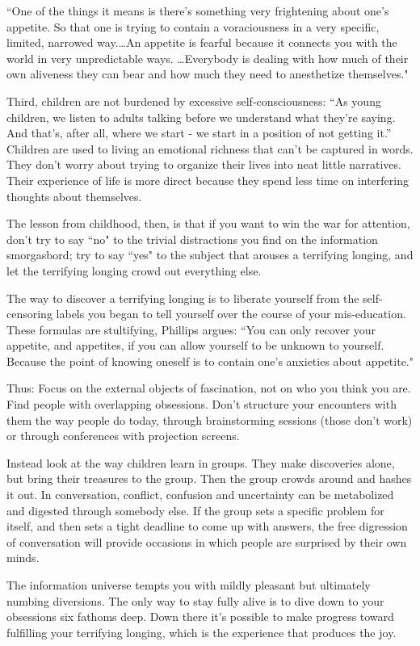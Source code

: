 \begin{linenumbers*}
\indent ``One of the things it means is there's something very frightening about one's appetite. So that one is trying to contain a voraciousness in a very specific, limited, narrowed way.\ldots An appetite is fearful because it connects you with the world in very unpredictable ways. \dots Everybody is dealing with how much of their own aliveness they can bear and how much they need to anesthetize themselves."

\indent Third, children are not burdened by excessive self-consciousness: ``As young children, we listen to adults talking before we understand what they're saying. And that's, after all, where we start - we start in a position of not getting it.” Children are used to living an emotional richness that can't be captured in words. They don't worry about trying to organize their lives into neat little narratives. Their experience of life is more direct because they spend less time on interfering thoughts about themselves.

\indent The lesson from childhood, then, is that if you want to win the war for attention, don't try to say ``no" to the trivial distractions you find on the information smorgasbord; try to say ``yes" to the subject that arouses a terrifying longing, and let the terrifying longing crowd out everything else.

The way to discover a terrifying longing is to liberate yourself from the self-censoring labels you began to tell yourself over the course of your mis-education. These formulas are stultifying, Phillips argues: ``You can only recover your appetite, and appetites, if you can allow yourself to be unknown to yourself. Because the point of knowing oneself is to contain one's anxieties about appetite."

\indent Thus: Focus on the external objects of fascination, not on who you think you are. Find people with overlapping obsessions. Don't structure your encounters with them the way people do today, through brainstorming sessions (those don't work) or through conferences with projection screens.

\indent Instead look at the way children learn in groups. They make discoveries alone, but bring their treasures to the group. Then the group crowds around and hashes it out. In conversation, conflict, confusion and uncertainty can be metabolized and digested through somebody else. If the group sets a specific problem for itself, and then sets a tight deadline to come up with answers, the free digression of conversation will provide occasions in which people are surprised by their own minds.

\indent The information universe tempts you with mildly pleasant but ultimately numbing diversions. The only way to stay fully alive is to dive down to your obsessions six fathoms deep. Down there it's possible to make progress toward fulfilling your terrifying longing, which is the experience that produces the joy.
\end{linenumbers*}

